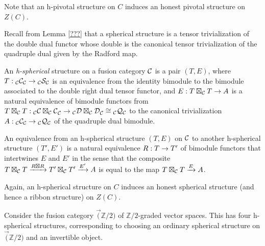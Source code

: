 \documentclass{amsart}
\begin{document}
\begin{remark}
Note that an h-pivotal structure on $C$ induces an honest pivotal structure on $Z(C)$.
\end{remark}

Recall from Lemma \ref{???} that a spherical structure is a tensor trivialization of the double dual functor whose double is the canonical tensor trivialization of the quadruple dual given by the Radford map.


\begin{definition}
An \emph{h-spherical} structure on a fusion category $\mathcal C$ is a pair $(T,E)$, where $T: {}_{\mathcal C} {\mathcal C}_{\mathcal C} \rightarrow {}_{\mathcal C} {\mathcal S}_{\mathcal C}$ is an equivalence from the identity bimodule to the bimodule associated to the double right dual tensor functor, and $E: T \boxtimes_{\mathcal C} T \rightarrow A$ is a natural equivalence of bimodule functors from $T \boxtimes_{\mathcal C} T: {}_{\mathcal C} {\mathcal C \boxtimes_{\mathcal C} \mathcal C}_{\mathcal C} \rightarrow {}_{\mathcal C} {\mathcal D \boxtimes_{\mathcal C} \mathcal D}_{\mathcal C} \cong {}_{\mathcal C} {\mathcal Q}_{\mathcal C}$ to the canonical trivialization $A : {}_{\mathcal C} {\mathcal C}_{\mathcal C} \rightarrow {}_{\mathcal C} {\mathcal Q}_{\mathcal C}$ of the quadruple dual bimodule.

An equivalence from an h-spherical structure $(T,E)$ on $\mathcal C$ to another h-spherical structure $(T',E')$ is a natural equivalence $R: T \rightarrow T'$ of bimodule functors that intertwines $E$ and $E'$ in the sense that the composite $T \boxtimes_{\mathcal C} T \xrightarrow{R \boxtimes R} T' \boxtimes_{\mathcal C} T' \xrightarrow{E'} A$ is equal to the map $T \boxtimes_{\mathcal C} T \xrightarrow{E} A$.
\end{definition}

\begin{remark}
Again, an h-spherical structure on $C$ induces an honest spherical structure (and hence a ribbon structure) on $Z(C)$.
\end{remark}

\begin{example}
Consider the fusion category $\Vec(\mathbb{Z}/2)$ of $\mathbb{Z}/2$-graded vector spaces.  This has four h-spherical structures, corresponding to choosing an ordinary spherical structure on $\Vec(\mathbb{Z}/2)$ and an invertible object.  
\end{example}
\end{document}
